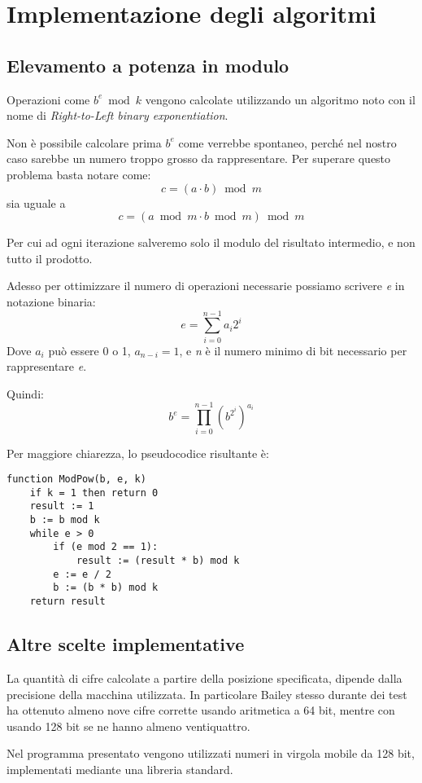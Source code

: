 \section{Implementazione degli algoritmi}
\label{sec:impl}
\subsection{Elevamento a potenza in modulo}
\label{sec:impl_pot}
Operazioni come $b^e\bmod{k}$ vengono calcolate utilizzando un algoritmo noto con il nome di \textit{Right-to-Left binary exponentiation}\cite[par. 4.6.3]{Knuth}.

Non è possibile calcolare prima $b^e$ come verrebbe spontaneo, perché nel nostro caso sarebbe un numero troppo grosso da rappresentare. Per superare questo problema basta notare come:
$$c = (a \cdot b)\bmod{m}$$
sia uguale a
$$c = (a\bmod{m} \cdot b\bmod{m})\bmod{m}$$

\noindent Per cui ad ogni iterazione salveremo solo il modulo del risultato intermedio, e non tutto il prodotto.

Adesso per ottimizzare il numero di operazioni necessarie possiamo scrivere \textit{e} in notazione binaria:
$$e = \sum\limits_{i=0}^{n-1} a_i 2^i$$
Dove $a_i$ può essere 0 o 1, $a_{n-i} = 1$, e \textit{n} è il numero minimo di bit necessario per rappresentare \textit{e}.

Quindi:
$$b^e = \prod\limits_{i=0}^{n-1} (b^{2^i})^{a_i}$$

\noindent Per maggiore chiarezza, lo pseudocodice risultante è:

\begin{mdframed}[backgroundcolor=bg]
\begin{verbatim}
function ModPow(b, e, k)
    if k = 1 then return 0
    result := 1
    b := b mod k
    while e > 0
        if (e mod 2 == 1):
            result := (result * b) mod k
        e := e / 2
        b := (b * b) mod k
    return result
\end{verbatim}
\end{mdframed}

\subsection{Altre scelte implementative}

La quantità di cifre calcolate a partire della posizione specificata, dipende dalla precisione della macchina utilizzata. In particolare Bailey stesso durante dei test ha ottenuto almeno nove cifre corrette usando aritmetica a 64 bit, mentre con usando 128 bit se ne hanno almeno ventiquattro.\cite[p.\ 4-5]{Bailey}
\newline

Nel programma presentato vengono utilizzati numeri in virgola mobile da 128 bit, implementati mediante una libreria standard.